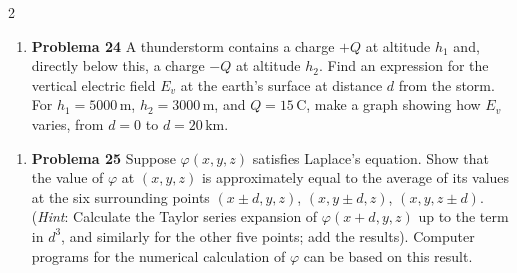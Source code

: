 \documentclass{article}
\newenvironment{MyColorPar}[1]{%
\leavevmode\color{#1}\ignorespaces%
}{%
}%
\begin{document}
\begin{multicols}{2}
\begin{enumerate}[label={{\textcolor{trueblue}{\textbf{Pr.} \arabic*.24}}}, start=3]
\item \textbf{Problema 24} A thunderstorm contains a charge $+Q$ at altitude $h_{1}$ and, directly below this, a charge $-Q$ at altitude $h_{2}$. Find an expression for the vertical electric field $E_{v}$ at the earth’s surface at distance $d$ from the storm. For $h_{1}=5000\,\mathrm{m}$, $h_{2}=3000\,\mathrm{m}$, and $Q=15\,\mathrm{C}$, make a graph showing how $E_{v}$ varies, from $d=0$ to $d=20\,\mathrm{km}$.
\end{enumerate}

\begin{enumerate}[label={{\textcolor{trueblue}{\textbf{Pr.} \arabic*.25}}}, start=3]
\item \textbf{Problema 25} Suppose $\varphi(x,y,z)$ satisfies Laplace’s equation. Show that the value of $\varphi$ at $(x,y,z)$ is approximately equal to the average of its values at the six surrounding points $(x \pm d, y, z)$, $(x, y \pm d, z)$, $(x, y, z \pm d)$. (\emph{Hint}: Calculate the Taylor series expansion of $\varphi(x + d, y, z)$ up to the term in $d^{3}$, and similarly for the other five points; add the results). Computer programs for the numerical calculation of $\varphi$ can be based on this result.
\end{enumerate}



	





\begin{MyColorPar}{orange(colorwheel)}

\end{MyColorPar}




	
\end{multicols}

\tableofcontents \newpage

\begin{center}
\end{center}  \vspace{2cm}
\end{document}
